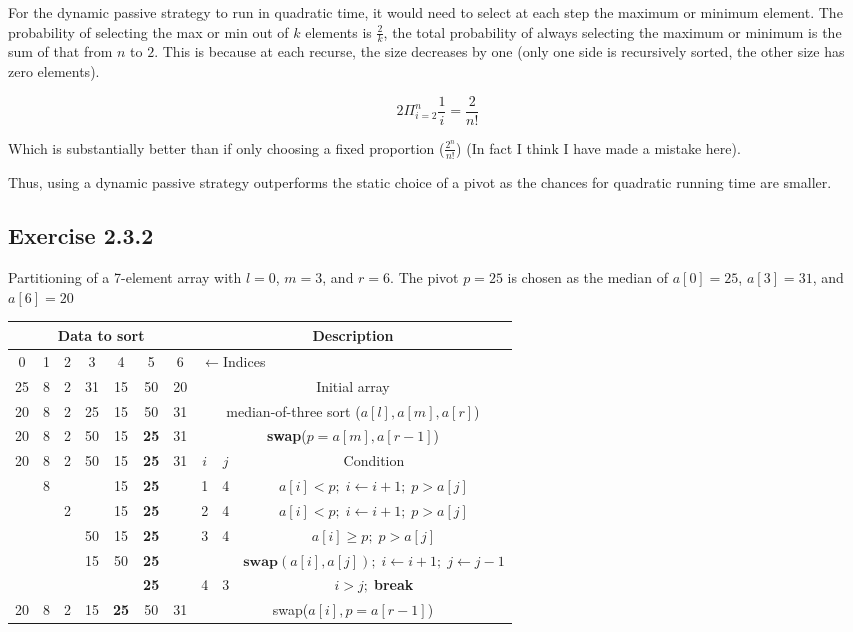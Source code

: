 \documentclass{article}
\begin{document}
For the dynamic passive strategy to run in quadratic time, it would need to select at each step the maximum or minimum element. The probability of selecting the max or min out of \(k\) elements is \(\frac{2}{k}\), the total probability of always selecting the maximum or minimum is the sum of that from \(n\) to \(2\). This is because at each recurse, the size decreases by one (only one side is recursively sorted, the other size has zero elements).

\[2\Pi_{i=2}^n\frac{1}{i} = \frac{2}{n!}\]

Which is substantially better than if only choosing a fixed proportion (\(\frac{2^n}{n!}\)) (In fact I think I have made a mistake here).

Thus, using a dynamic passive strategy outperforms the static choice of a pivot as the chances for quadratic running time are smaller.


\subsection*{Exercise 2.3.2}

Partitioning of a 7-element array with \(l=0\), \(m=3\), and \(r=6\). The pivot \(p=25\) is chosen as the median of \(a[0]=25\), \(a[3]=31\), and \(a[6]=20\)

\begin{tabular}{|c|c|c|c|c|c|c|c|c|c|}
\hline
\multicolumn{7}{|c|}{\textbf{Data to sort}}& \multicolumn{3}{|c|}{\textbf{Description}}\\
\hline
0& 1& 2& 3& 4& 5& 6& \multicolumn{3}{|l|}{ \(\leftarrow\)Indices} \\
\hline
25& 8& 2& 31& 15& 50& 20& \multicolumn{3}{|c|}{Initial array} \\
\hline
20& 8& 2& 25& 15& 50& 31& \multicolumn{3}{|c|}{median-of-three sort (\( a[l],a[m],a[r] \))} \\
\hline
20& 8& 2& 50& 15& \textbf{25} & 31& \multicolumn{3}{|c|}{ \textbf{swap}(\( p=a[m],a[r-1] \))} \\
\hline
20& 8& 2& 50& 15& \textbf{25} & 31& \(i\)& \(j\)& Condition \\
\hline
 & 8& & & 15& \textbf{25}& & 1& 4& \(a[i]<p;\; i\leftarrow i+1;\; p>a[j]\) \\
\hline
 & & 2& & 15& \textbf{25}& & 2& 4& \(a[i]<p;\; i\leftarrow i+1;\; p>a[j]\) \\
\hline
 & & & 50& 15& \textbf{25}& & 3& 4& \(a[i]\geq p;\; p>a[j]\) \\
\cline{1-7}
 & & & 15& 50& \textbf{25}& & & & \(\textbf{swap}(a[i],a[j]);\; i\leftarrow i+1;\; j\leftarrow j-1\) \\
\hline
 & & & & & \textbf{25}& & 4& 3& \(i >j;\;\)\textbf{break} \\
\hline
20& 8& 2& 15& \textbf{25}& 50& 31& \multicolumn{3}{|c|}{swap(\(a[i],p=a[r-1]\))} \\
\hline
\end{tabular}
\end{document}
